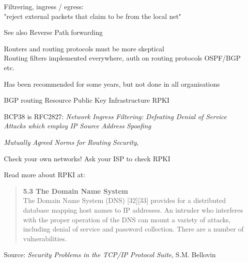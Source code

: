 \documentclass[Screen16to9,17pt]{foils}
\begin{document}
\begin{list2}
\item Filtrering, ingress / egress:\\
"reject external packets that claim to be from the local net"
\item See also Reverse Path forwarding 
\item Routers and routing protocols must be more skeptical\\
Routing filters implemented everywhere, auth on routing protocols OSPF/BGP etc.
\item Has been recommended for some years, but not done in all organisations
\item BGP routing Resource Public Key Infrastructure RPKI
\item BCP38 is RFC2827: \emph{Network Ingress Filtering: Defeating Denial of Service Attacks which employ IP Source Address Spoofing}\\
\item \emph{Mutually Agreed Norms for Routing Security}, 
\end{list2}




\begin{list2}
\item Check your own networks! Ask your ISP to check RPKI\\
\item Read more about RPKI at:\\
\end{list2}


\begin{quote}
{\bf 5.3 The Domain Name System}\\
The Domain Name System (DNS) [32][33] provides for a distributed database mapping host names to IP addresses. An intruder who interferes with the proper operation of the DNS can mount a variety of attacks, including denial of service and password collection. There are a number of vulnerabilities.
\end{quote}
Source: \emph{Security Problems in the TCP/IP Protocol Suite}, S.M. Bellovin\\
\end{document}
